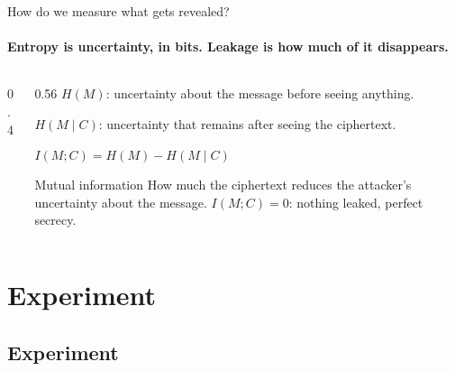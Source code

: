 \documentclass[11pt,aspectratio=169]{beamer}
\newcommand{\Ent}[1]{H\!\left(#1\right)}          %
\newcommand{\CEnt}[2]{H\!\left(#1 \mid #2\right)} %
\newcommand{\MI}[2]{I\!\left(#1 ; #2\right)}      %
\newcommand{\msg}{M}
\newcommand{\ctxt}{C}
\newcommand{\keyeq}[1]{\begin{center}\large\color{deep}$\displaystyle #1$\end{center}}
\begin{document}
\begin{frame}{How do we measure what gets revealed?}
  \framesubtitle{Entropy is uncertainty, in bits. Leakage is how much of it disappears.}
  \begin{columns}[T]
    \begin{column}{0.4\textwidth}
      \begin{center}
      \end{center}
    \end{column}
    \begin{column}{0.56\textwidth}
      $\Ent{\msg}$: uncertainty about the message before seeing anything.

      $\CEnt{\msg}{\ctxt}$: uncertainty that remains after seeing the
      ciphertext.
      \keyeq{\MI{\msg}{\ctxt}=\Ent{\msg}-\CEnt{\msg}{\ctxt}}
      \begin{block}{Mutual information}
        How much the ciphertext reduces the attacker's uncertainty about
        the message. $\MI{\msg}{\ctxt}=0$: nothing leaked, perfect secrecy.
      \end{block}
    \end{column}
  \end{columns}
\end{frame}

\section{Experiment}
\subsection{Experiment}
\end{document}
